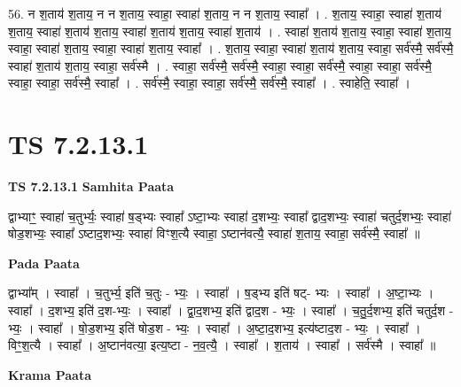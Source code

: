 \documentclass[17pt]{extarticle}
\begin{document}
56. न श॒ताय॑ श॒ताय॒ न न श॒ताय॒ स्वाहा॒ स्वाहा॑ श॒ताय॒ न न श॒ताय॒ स्वाहा᳚ । . श॒ताय॒ स्वाहा॒ स्वाहा॑ श॒ताय॑ श॒ताय॒ स्वाहा॑ श॒ताय॑ श॒ताय॒ स्वाहा॑ श॒ताय॑ श॒ताय॒ स्वाहा॑ श॒ताय॑ । . स्वाहा॑ श॒ताय॑ श॒ताय॒ स्वाहा॒ स्वाहा॑ श॒ताय॒ स्वाहा॒ स्वाहा॑ श॒ताय॒ स्वाहा॒ स्वाहा॑ श॒ताय॒ स्वाहा᳚ । . श॒ताय॒ स्वाहा॒ स्वाहा॑ श॒ताय॑ श॒ताय॒ स्वाहा॒ सर्व॑स्मै॒ सर्व॑स्मै॒ स्वाहा॑ श॒ताय॑ श॒ताय॒ स्वाहा॒ सर्व॑स्मै । . स्वाहा॒ सर्व॑स्मै॒ सर्व॑स्मै॒ स्वाहा॒ स्वाहा॒ सर्व॑स्मै॒ स्वाहा॒ स्वाहा॒ सर्व॑स्मै॒ स्वाहा॒ स्वाहा॒ सर्व॑स्मै॒ स्वाहा᳚ । . सर्व॑स्मै॒ स्वाहा॒ स्वाहा॒ सर्व॑स्मै॒ सर्व॑स्मै॒ स्वाहा᳚ । . स्वाहेति॒ स्वाहा᳚ । \newline
\pagebreak
{}

\section{ TS 7.2.13.1 }

\textbf{TS 7.2.13.1 } \newline
\textbf{Samhita Paata} \newline

द्वाभ्याꣳ॒॒ स्वाहा॑ च॒तुर्भ्यः॒ स्वाहा॑ ष॒ड्भ्यः स्वाहा᳚ ऽष्टा॒भ्यः स्वाहा॑ द॒शभ्यः॒ स्वाहा᳚ द्वाद॒शभ्यः॒ स्वाहा॑ चतुर्द॒शभ्यः॒ स्वाहा॑ षोड॒शभ्यः॒ स्वाहा᳚ ऽष्टाद॒शभ्यः॒ स्वाहा॑ विꣳश॒त्यै स्वाहा॒ ऽष्टान॑वत्यै॒ स्वाहा॑ श॒ताय॒ स्वाहा॒ सर्व॑स्मै॒ स्वाहा᳚ ॥ \newline

\textbf{Pada Paata} \newline

द्वाभ्या᳚म् । स्वाहा᳚ । च॒तुर्भ्य॒ इति॑ च॒तुः - भ्यः॒ । स्वाहा᳚ । ष॒ड्भ्य इति॑ षट्- भ्यः । स्वाहा᳚ । अ॒ष्टा॒भ्यः । स्वाहा᳚ । द॒शभ्य॒ इति॑ द॒श-भ्यः॒ । स्वाहा᳚ । द्वा॒द॒शभ्य॒ इति॑ द्वाद॒श - भ्यः॒ । स्वाहा᳚ । च॒तु॒र्द॒शभ्य॒ इति॑ चतुर्द॒श - भ्यः॒ । स्वाहा᳚ । षो॒ड॒शभ्य॒ इति॑ षोड॒श - भ्यः॒ । स्वाहा᳚ । अ॒ष्टा॒द॒शभ्य॒ इत्य॑ष्टाद॒श - भ्यः॒ । स्वाहा᳚ । विꣳ॒॒श॒त्यै । स्वाहा᳚ । अ॒ष्टान॑वत्या॒ इत्य॒ष्टा - न॒व॒त्यै॒ । स्वाहा᳚ । श॒ताय॑ । स्वाहा᳚ । सर्व॑स्मै । स्वाहा᳚ ॥  \newline


\textbf{Krama Paata} \newline
\end{document}
